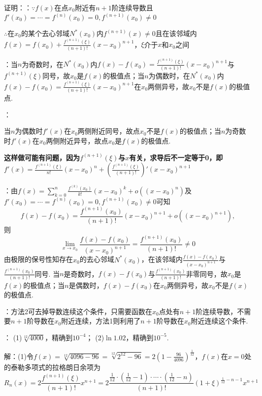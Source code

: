 \documentclass[12pt,UTF8]{ctexart}
\begin{document}
\begin{enumerate}
证明：{：}$\because f(x)$在点$x_0$附近有$n+1$阶连续导数且$f'(x_0)=\cdots=f^{(n)}(x_0)=0,f^{(n+1)}(x_0)\neq0$

$\therefore$在$x_0$的某个去心邻域$N^*(x_0)$内$f^{(n+1)}(x)\neq0$且在该邻域内$f(x)=f(x_0)+\frac{f^{(n+1)}(\xi)}{(n+1)!}(x-x_0)^{n+1}$，$\xi$介于$x$和$x_0$之间

{：}当$n$为奇数时，在$N^*(x_0)$内$f(x)-f(x_0)=\frac{f^{(n+1)}(\xi)}{(n+1)!}(x-x_0)^{n+1}$与$f^{(n+1)}(\xi)$同号，故$x_0$是$f(x)$的极值点；当$n$为偶数时，在$N^*(x_0)$内$f(x)-f(x_0)=\frac{f^{(n+1)}(\xi)}{(n+1)!}(x-x_0)^{n+1}$在$x_0$两侧异号，故$x_0$不是$f(x)$的极值点. 

{：}{\bf{}

当$n$为偶数时$f'(x)$在$x_0$两侧附近同号，故点$x_0$不是$f(x)$的极值点；当$n$为奇数时$f'(x)$在$x_0$两侧附近异号，故点$x_0$是$f(x)$的极值点.}

{\bf\color{red}这样做可能有问题，因为$f^{(n+1)}(\xi)$与$x$有关，求导后不一定等于0，即$f'(x)=\frac{f^{(n+1)}(\xi)}{n!}(x-x_0)^n+(\frac{f^{(n+1)}(\xi)}{(n+1)!})'(x-x_0)^{n+1}$}

{：}由$f(x)=\sum_{k=0}^n\frac{f^{(k)}(x_0)}{k!}(x-x_0)^k+o((x-x_0)^n)$及$f'(x_0)=\cdots=f^{(n)}(x_0)=0,f^{(n+1)}(x_0)\neq0$可知
\[
f(x)-f(x_0)=\frac{f^{(n+1)}(x_0)}{(n+1)!}(x-x_0)^{n+1}+o((x-x_0)^{n+1}),
\]
则\[
\lim\limits_{x\rightarrow x_0}\frac{f(x)-f(x_0)}{(x-x_0)^{n+1}}=\frac{f^{(n+1)}(x_0)}{(n+1)!}\neq0
\]
由极限的保号性知存在$x_0$的去心邻域$N^*(x_0)$，在该邻域内$\frac{f(x)-f(x_0)}{(x-x_0)^{n+1}}$与$\frac{f^{(n+1)}(x_0)}{(n+1)!}$同号. 当$n$是奇数时，$f(x)-f(x_0)$与$\frac{f^{(n+1)}(x_0)}{(n+1)!}$非零同号，故$x_0$是$f(x)$的极值点；当$n$是偶数时，$f(x)-f(x_0)$在$x_0$两侧异号，故$x_0$不是$f(x)$的极值点.

{：方法2可去掉导数连续这个条件，只需要函数在$x_0$点处有$n+1$阶连续导数，不需要$n+1$阶导数在$x_0$附近连续，方法1则利用了$n+1$阶导数在$x_0$附近连续这个条件.}

：
\newline
(1)$\sqrt[12]{4000}$，精确到$10^{-4}$；
\newline
(2)$\ln1.02$，精确到$10^{-5}$.

解：(1)令$f(x)=\sqrt[12]{4096-96}=\sqrt[12]{2^{12}-96}=2(1-\frac{96}{4096})^{\frac1{12}}$，$f(x)$在$x=0$处的泰勒多项式的拉格朗日余项为
\[R_n(x)=2\frac{f^{(n+1)}(\xi)}{(n+1)!}x^{n+1}=2\frac{\frac1{12}\cdot(\frac1{12}-1)\cdot\cdots\cdot(\frac1{12}-n)}{(n+1)!}(1+\xi)^{\frac1{12}-n-1}x^{n+1}\]


\end{enumerate}
\end{document}
